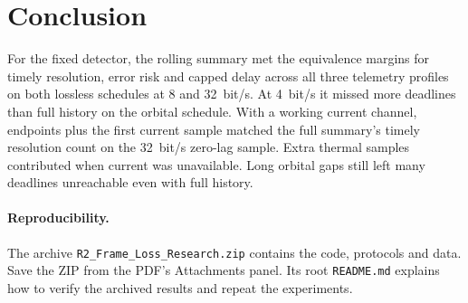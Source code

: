 \documentclass[a4paper]{llncs}
\begin{document}
\section{Conclusion}
For the fixed detector, the rolling summary met the equivalence margins for timely resolution, error risk and capped delay across all three telemetry profiles on both lossless schedules at 8 and 32~bit/s. At 4~bit/s it missed more deadlines than full history on the orbital schedule. With a working current channel, endpoints plus the first current sample matched the full summary's timely resolution count on the 32~bit/s zero-lag sample. Extra thermal samples contributed when current was unavailable. Long orbital gaps still left many deadlines unreachable even with full history. 

\paragraph{Reproducibility.} The archive \texttt{R2\_Frame\_Loss\_Research.zip} contains the code, protocols and data. \ifResearchAttached Save the ZIP from the PDF's Attachments panel. \fi Its root \texttt{README.md} explains how to verify the archived results and repeat the experiments.


\end{document}
